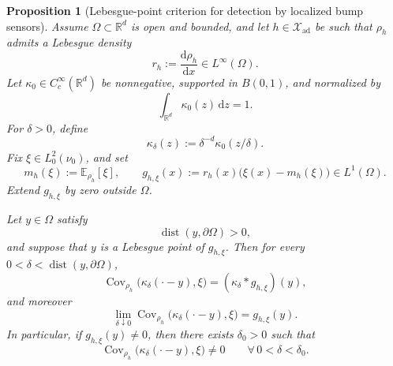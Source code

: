 \documentclass{article}
\newtheorem{proposition}[theorem]{Proposition}
\theoremstyle{definition}
\DeclareMathOperator{\dist}{dist}
\renewcommand{\d}{\mathrm{d}}
\begin{document}
\begin{proposition}[Lebesgue-point criterion for detection by localized bump sensors]
    \label{prop:lebesgue-point-detectability}
    Assume \(\Omega\subset\mathbb R^d\) is open and bounded, and let \(h\in\mathcal X_{\mathrm{ad}}\)
    be such that \(\rho_h\) admits a Lebesgue density
    \[
        r_h:=\frac{\d\rho_h}{\d x}\in L^\infty(\Omega).
    \]
    Let \(\kappa_0\in C_c^\infty(\mathbb R^d)\) be nonnegative, supported in \(B(0,1)\), and normalized by
    \[
        \int_{\mathbb R^d}\kappa_0(z)\,\d z=1.
    \]
    For \(\delta>0\), define
    \[
        \kappa_\delta(z):=\delta^{-d}\kappa_0(z/\delta).
    \]
    Fix \(\xi\in L^2_0(\nu_0)\), and set
    \[
        m_h(\xi):=\mathbb E_{\rho_h}[\xi],
        \qquad
        g_{h,\xi}(x):=r_h(x)\bigl(\xi(x)-m_h(\xi)\bigr)\in L^1(\Omega).
    \]
    Extend \(g_{h,\xi}\) by zero outside \(\Omega\).

    Let \(y\in\Omega\) satisfy
    \[
        \dist(y,\partial\Omega)>0,
    \]
    and suppose that \(y\) is a Lebesgue point of \(g_{h,\xi}\). Then for every
    \(0<\delta<\dist(y,\partial\Omega)\),
    \begin{equation}
        \label{eq:covariance-as-convolution}
        \operatorname{Cov}_{\rho_h}\!\bigl(\kappa_\delta(\cdot-y),\xi\bigr)
        =
        (\kappa_\delta * g_{h,\xi})(y),
    \end{equation}
    and moreover
    \begin{equation}
        \label{eq:lebesgue-point-detection-limit}
        \lim_{\delta\downarrow 0}
        \operatorname{Cov}_{\rho_h}\!\bigl(\kappa_\delta(\cdot-y),\xi\bigr)
        =
        g_{h,\xi}(y).
    \end{equation}
    In particular, if \(g_{h,\xi}(y)\neq 0\), then there exists \(\delta_0>0\) such that
    \[
        \operatorname{Cov}_{\rho_h}\!\bigl(\kappa_\delta(\cdot-y),\xi\bigr)\neq 0
        \qquad
        \forall\,0<\delta<\delta_0.
    \]
\end{proposition}
\end{document}
